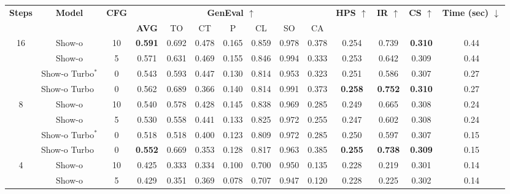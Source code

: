 \begin{table*}[t]
    \centering
    \setlength{\tabcolsep}{4pt} %
    \begin{tabular}{ccc|ccccccc|ccc|c}
        \toprule
        \multirow{2}{*}{\textbf{\small Steps}} & \multirow{2}{*}{\textbf{\small Model}} & \multirow{2}{*}{\textbf{\small CFG}} & \multicolumn{7}{c|}{\textbf{\small GenEval \large$\uparrow$}} & \multirow{2}{*}{\textbf{\small HPS \large$\uparrow$}} & \multirow{2}{*}{\textbf{\small IR \large$\uparrow$}} & \multirow{2}{*}{\textbf{\small CS \large$\uparrow$}} & \multirow{2}{*}{\textbf{\small Time (sec) \large$\downarrow$}} \\
        \cmidrule(lr){4-10} %
         &  &  & \textbf{\small AVG} & {\small TO} & {\small CT} & {\small P} & {\small CL} & {\small SO} & {\small CA} &  &  &  &  \\
        \midrule
        \multirow{4}{*}{16} & Show-o & 10 & \textbf{0.591} & 0.692 & 0.478 & 0.165 & 0.859 & 0.978 & 0.378 & 0.254 & 0.739 & \textbf{0.310} & 0.44 \\
         & Show-o & 5 & 0.571 & 0.631 & 0.469 & 0.155 & 0.846 & 0.994 & 0.333 & 0.253 & 0.642 & 0.309 & 0.44 \\
         & Show-o Turbo$^*$ & 0 & 0.543 & 0.593 & 0.447 & 0.130 & 0.814 & 0.953 & 0.323 & 0.251 & 0.586 & 0.307 & 0.27 \\
         & Show-o Turbo$\;\,$ & 0 & 0.562 & 0.689 & 0.366 & 0.140 & 0.814 & 0.991 & 0.373 & \textbf{0.258} & \textbf{0.752} & \textbf{0.310} & 0.27 \\
        \midrule
        \multirow{4}{*}{8} & Show-o & 10 & 0.540 & 0.578 & 0.428 & 0.145 & 0.838 & 0.969 & 0.285 & 0.249 & 0.665 & 0.308 & 0.24 \\
         & Show-o & 5 & 0.530 & 0.558 & 0.441 & 0.133 & 0.825 & 0.972 & 0.255 & 0.247 & 0.602 & 0.308 & 0.24 \\
         & Show-o Turbo$^*$ & 0 & 0.518 & 0.518 & 0.400 & 0.123 & 0.809 & 0.972 & 0.285 & 0.250 & 0.597 & 0.307 & 0.15 \\
         & Show-o Turbo$\;\,$ & 0 & \textbf{0.552} & 0.669 & 0.353 & 0.128 & 0.817 & 0.963 & 0.385 & \textbf{0.255} & \textbf{0.738} & \textbf{0.309} & 0.15 \\
        \midrule
        \multirow{4}{*}{4} & Show-o & 10 & 0.425 & 0.333 & 0.334 & 0.100 & 0.700 & 0.950 & 0.135 & 0.228 & 0.219 & 0.301 & 0.14 \\
         & Show-o & 5 & 0.429 & 0.351 & 0.369 & 0.078 & 0.707 & 0.947 & 0.120 & 0.228 & 0.225 & 0.302 & 0.14 \\

\end{tabular}
\end{table*}
